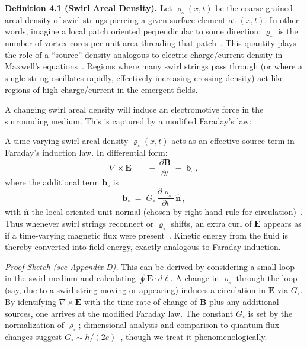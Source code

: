 \documentclass[aps,onecolumn,10pt,nofootinbib]{revtex4}
\begin{document}
	\textbf{Definition 4.1 (Swirl Areal Density).} Let $\varrho_{\circ}(x,t)$ be the coarse-grained areal density of swirl strings piercing a given surface element at $(x,t)$. In other words, imagine a local patch oriented perpendicular to some direction; $\varrho_{\circ}$ is the number of vortex cores per unit area threading that patch~\cite{index56}. This quantity plays the role of a “source” density analogous to electric charge/current density in Maxwell’s equations~\cite{index57}. Regions where many swirl strings pass through (or where a single string oscillates rapidly, effectively increasing crossing density) act like regions of high charge/current in the emergent fields.

	A changing swirl areal density will induce an electromotive force in the surrounding medium. This is captured by a modified Faraday’s law:

	\begin{tcolorbox}[title=Theorem 4.1: Swirl-Induced Electromotive Force]
		A time-varying swirl areal density $\varrho_{\circ}(x,t)$ acts as an effective source term in Faraday’s induction law. In differential form:
		\[
			\nabla \times \mathbf{E} \;=\; -\,\frac{\partial \mathbf{B}}{\partial t}\;-\; \mathbf{b}_{\circ}\,,
		\]
		where the additional term $\mathbf{b}_{\circ}$ is
		\[
			\mathbf{b}_{\circ} \;=\; G_{\circ}\,\frac{\partial \varrho_{\circ}}{\partial t}\,\hat{\mathbf{n}}\,,
		\]
		with $\hat{\mathbf{n}}$ the local oriented unit normal (chosen by right-hand rule for circulation)~\cite{index58}. Thus whenever swirl strings reconnect or $\varrho_{\circ}$ shifts, an extra curl of $\mathbf{E}$ appears as if a time-varying magnetic flux were present~\cite{index59}. Kinetic energy from the fluid is thereby converted into field energy, exactly analogous to Faraday induction.
	\end{tcolorbox}

	\noindent \textit{Proof Sketch (see Appendix D).} This can be derived by considering a small loop in the swirl medium and calculating $\oint \mathbf{E}\cdot d\ell$. A change in $\varrho_{\circ}$ through the loop (say, due to a swirl string moving or appearing) induces a circulation in $\mathbf{E}$ via $G_{\circ}$. By identifying $\nabla \times \mathbf{E}$ with the time rate of change of $\mathbf{B}$ plus any additional sources, one arrives at the modified Faraday law. The constant $G_{\circ}$ is set by the normalization of $\varrho_{\circ}$; dimensional analysis and comparison to quantum flux changes suggest $G_{\circ}\sim h/(2e)$~\cite{index60}, though we treat it phenomenologically.
\end{document}
